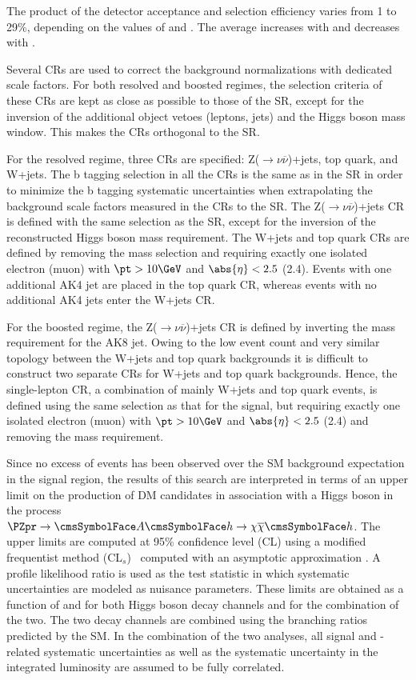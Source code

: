 The product of the detector acceptance and selection efficiency varies from
1 to 29\%, depending on the values of
\mzp and \maz. The average \MET increases with \mzp and decreases with \maz.

Several CRs are used to
correct the background normalizations with dedicated scale factors. For both resolved and boosted regimes, the selection criteria of these 
CRs are kept as close as possible to those of the SR, except for the inversion of the additional
object vetoes (leptons, jets) and the Higgs boson mass window.
This makes the CRs orthogonal to the SR.

For the resolved regime, three CRs are specified: Z($\to\nu\overline{\nu}$)+jets,
top quark, and W+jets.
The b tagging selection in all the CRs is the same as in the SR in order to minimize the b tagging systematic uncertainties
when extrapolating the background scale factors measured in the CRs to the SR.
The Z($\to\nu\overline{\nu}$)+jets CR is defined with the same selection as the
SR, except for the inversion of the reconstructed Higgs boson mass requirement.
The W+jets and top quark CRs are defined by removing the mass selection and
requiring exactly one isolated electron (muon) with $\pt > 10\GeV$ and
$\abs{\eta}< 2.5$ (2.4).
Events with one additional AK4 jet are placed in the top quark CR, whereas
events with no additional AK4 jets enter the W+jets CR.

For the boosted regime, the Z($\to\nu\overline{\nu}$)+jets CR is defined by inverting the mass requirement for the AK8 jet.
Owing to the low event count and very similar topology between the W+jets and top
quark backgrounds it is difficult to
construct two separate CRs for W+jets and top quark backgrounds.
Hence, the single-lepton CR, a combination of mainly W+jets and top quark
events, is defined using the same selection as that for the signal, but
requiring exactly one isolated electron (muon) with $\pt > 10\GeV$ and
$\abs{\eta}< 2.5$ (2.4)
and removing the mass requirement.

Since no excess of events has been observed over the SM background expectation in the signal region, the results of this search are 
interpreted in terms of an upper limit on the production
of DM candidates in association with a Higgs boson
in the process  $\PZpr \to \Az \Ph \to \chi \overline{\chi} \Ph$.
The upper limits are computed at 95\% confidence level (CL) using a modified frequentist method 
(CL$_s$)~\cite{yellowReport, bib:CLS1, bib:CLS2} computed with an asymptotic approximation \cite{bib:CLS3}.
A profile likelihood ratio is used as the test statistic in which systematic uncertainties are modeled as nuisance parameters.
These limits are obtained as a function of \mzp and \maz for both Higgs boson decay channels and for the combination of the two.
The two decay channels are combined using the branching ratios predicted by the SM.
In the combination of the two analyses, all signal and \MET-related systematic uncertainties as well as the systematic uncertainty in the 
integrated luminosity
are assumed to be fully correlated.

